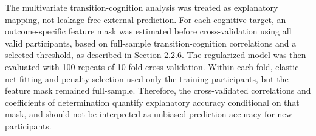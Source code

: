 \documentclass[12pt,a4paper]{report}
\begin{document}


The multivariate transition-cognition analysis was treated as explanatory mapping, not leakage-free external prediction. For each cognitive target, an outcome-specific feature mask was estimated before cross-validation using all valid participants, based on full-sample transition-cognition correlations and a selected threshold, as described in Section 2.2.6. The regularized model was then evaluated with 100 repeats of 10-fold cross-validation. Within each fold, elastic-net fitting and penalty selection used only the training participants, but the feature mask remained full-sample. Therefore, the cross-validated correlations and coefficients of determination quantify explanatory accuracy conditional on that mask, and should not be interpreted as unbiased prediction accuracy for new participants.
\end{document}
